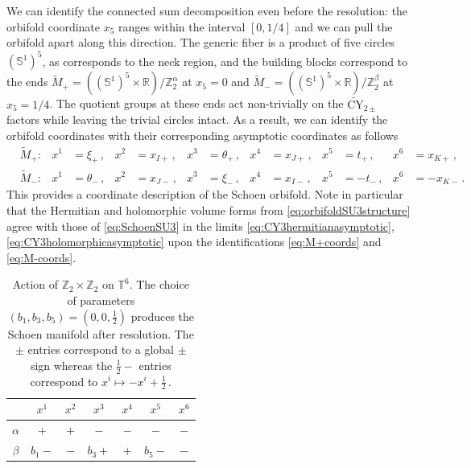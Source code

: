 \documentclass{pspum-l}
\newcommand*\Sc{\mathbb{S}}
\newcommand*\R{\mathbb{R}}
\theoremstyle{definition}
\theoremstyle{remark}
\numberwithin{equation}{section}
\begin{document}
We can identify the connected sum decomposition even before the resolution: the orbifold coordinate $x_5$ ranges within the interval $[0,1/4]$ and we can pull the orbifold apart along this direction. The generic fiber is a product of five circles $(\Sc^1)^5$, as corresponds to the neck region, and the building blocks correspond to the ends $\widetilde{M}_+=\left((\Sc^1)^5\times \R\right) / \mathbb{Z}_2^\alpha$ at $x_5=0$ and $\widetilde{M}_-=\left((\Sc^1)^5\times \R\right) / \mathbb{Z}_2^\beta$ at $x_5=1/4$. The quotient groups at these ends act non-trivially on the $\widetilde{\text{CY}}_{2\pm}$ factors while leaving the trivial circles intact. As a result, we can identify the orbifold coordinates with their corresponding asymptotic coordinates as follows
\begin{align}
\label{eq:M+coords}
    &\widetilde{M}_+:&  x^1&=\xi_+\, , & x^2&=x_{I+} \, , & x^3&=\theta_+\, , & x^4&=x_{J+} \, , & x^5&=t_+\, , & x^6&=x_{K+} \, ,  \\
    \label{eq:M-coords}
    &\widetilde{M}_-:&  x^1&=\theta_-\, , & x^2&=x_{J-} \, , & x^3&=\xi_-\, , & x^4&=x_{I-} \, , & x^5&=-t_-\, , & x^6&=-x_{K-} \, .
\end{align}
This provides a coordinate description of the Schoen orbifold. Note in particular that the Hermitian and holomorphic volume forms from \eqref{eq:orbifoldSU3structure} agree with those of \eqref{eq:SchoenSU3} in the limits \eqref{eq:CY3hermitianasymptotic}, \eqref{eq:CY3holomorphicasymptotic} upon the identifications \eqref{eq:M+coords} and \eqref{eq:M-coords}.

{\renewcommand{\arraystretch}{1.2}
\begin{table}
\begin{tabular}{ |c||c|c|c|c|c|c| } 
\hline
   & $x^1$ & $x^2$ & $x^3$ & $x^4$ & $x^5$ & $x^6$ \\
 \hline
 \hline
 $\alpha$ & $+$ & $+$ & $-$ & $-$ & $-$ & $-$ \\
 \hline
$\beta$ & $b_1-$ & $-$ & $b_3+$ & $+$ & $b_5-$ & $-$ \\ 
\hline
\end{tabular}
\caption{Action of $\mathbb{Z}_2\times\mathbb{Z}_2$ on $\mathbb{T}^6$. The choice of parameters $(b_1,b_3,b_5)=(0,0,\frac{1}{2})$ produces the Schoen manifold after resolution. The $\pm$ entries correspond to a global $\pm$ sign whereas the $\frac{1}{2}-$ entries correspond to $x^i\mapsto-x^i+\frac{1}{2}\,$.}
\label{tab:discreteaction}
\end{table}}
\end{document}
